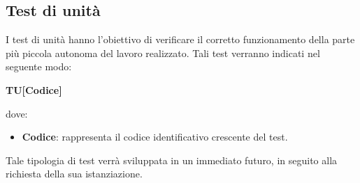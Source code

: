 \subsection{Test di unità}
I test di unità hanno l'obiettivo di verificare il corretto funzionamento della parte più piccola autonoma del lavoro realizzato. Tali test verranno indicati nel seguente modo:\\
	\centerline{\textbf{TU[Codice]}}
dove:
\begin{itemize}
	\item \textbf{Codice}: rappresenta il codice identificativo crescente del test.
\end{itemize}
Tale tipologia di test verrà sviluppata in un immediato futuro, in seguito alla richiesta della sua istanziazione.


\renewcommand{\arraystretch}{1.5}
	
